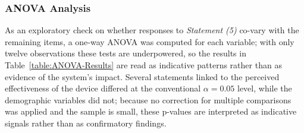 \subsubsection{ANOVA Analysis}
As an exploratory check on whether responses to \textit{Statement (5)} co-vary with the remaining items, a one-way ANOVA was computed for each variable; with only twelve observations these tests are underpowered, so the results in Table~\ref{table:ANOVA-Results} are read as indicative patterns rather than as evidence of the system's impact. Several statements linked to the perceived effectiveness of the device differed at the conventional $\alpha = 0.05$ level, while the demographic variables did not; because no correction for multiple comparisons was applied and the sample is small, these p-values are interpreted as indicative signals rather than as confirmatory findings.

